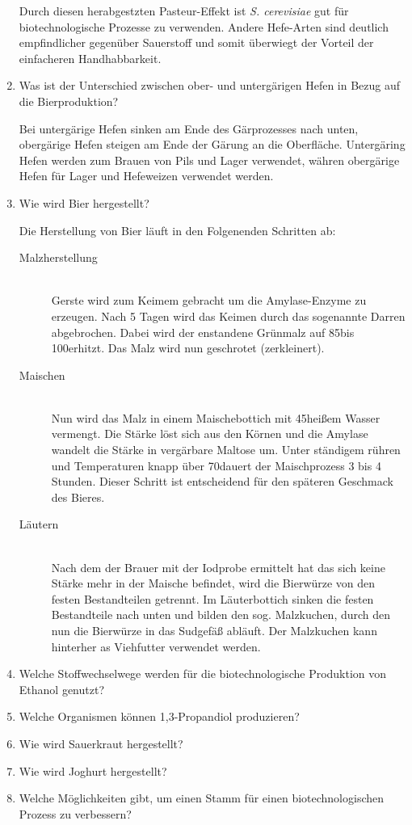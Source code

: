 \begin{enumerate}
		Durch diesen herabgestzten Pasteur-Effekt ist \emph{S. cerevisiae} gut für biotechnologische Prozesse zu verwenden.
		Andere Hefe-Arten sind deutlich empfindlicher gegenüber Sauerstoff
		und somit überwiegt der Vorteil der einfacheren Handhabbarkeit.
			
	\item Was ist der Unterschied zwischen ober- und untergärigen Hefen in Bezug auf die Bierproduktion?
		
		Bei untergärige Hefen sinken am Ende des Gärprozesses nach unten,
		obergärige Hefen steigen am Ende der Gärung an die Oberfläche.
		Untergäring Hefen werden zum Brauen von Pils und Lager verwendet,
		währen obergärige Hefen für Lager und Hefeweizen verwendet werden.

	\item Wie wird Bier hergestellt?

		Die Herstellung von Bier läuft in den Folgenenden Schritten ab:
		\begin{description}
			\item[Malzherstellung] \hfill \\
				Gerste wird zum Keimem gebracht um die Amylase-Enzyme zu erzeugen.
				Nach 5 Tagen wird das Keimen durch das sogenannte Darren abgebrochen.
				Dabei wird der enstandene Grünmalz auf 85\textdegree bis 100\textdegree erhitzt.
				Das Malz wird nun geschrotet (zerkleinert).
			\item[Maischen] \hfill \\
				Nun wird das Malz in einem Maischebottich mit 45\textdegree heißem Wasser vermengt.
				Die Stärke löst sich aus den Körnen und die Amylase wandelt die Stärke in vergärbare Maltose um.
				Unter ständigem rühren und Temperaturen knapp über 70\textdegree dauert der Maischprozess 3 bis 4 Stunden.
				Dieser Schritt ist entscheidend für den späteren Geschmack des Bieres.
			\item[Läutern] \hfill \\
				Nach dem der Brauer mit der Iodprobe ermittelt hat das sich keine Stärke mehr in der Maische befindet,
				wird die Bierwürze von den festen Bestandteilen getrennt.
				Im Läuterbottich sinken die festen Bestandteile nach unten und bilden den sog. Malzkuchen,
				durch den nun die Bierwürze in das Sudgefäß abläuft.
				Der Malzkuchen kann hinterher as Viehfutter verwendet werden.
		\end{description}
			
	\item Welche Stoffwechselwege werden für die biotechnologische Produktion von Ethanol genutzt?
	\item Welche Organismen können 1,3-Propandiol produzieren?
	\item Wie wird Sauerkraut hergestellt?
	\item Wie wird Joghurt hergestellt?
	\item Welche Möglichkeiten gibt, um einen Stamm für einen biotechnologischen Prozess zu verbessern?
\end{enumerate}
